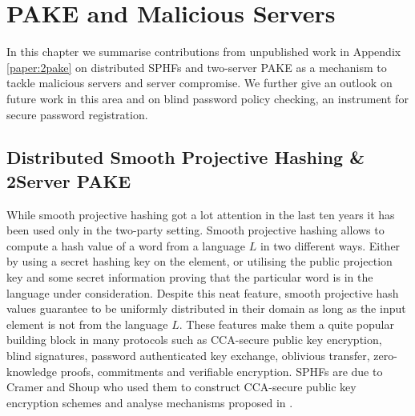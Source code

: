 \chapter{PAKE and Malicious Servers}\label{ch:malservers}
In this chapter we summarise contributions from unpublished work in Appendix \ref{paper:2pake} on distributed \aclp{SPHF} and two-server \ac{PAKE} as a mechanism to tackle malicious servers and server compromise.
We further give an outlook on future work in this area and on blind password policy checking, an instrument for secure password registration.

\section{Distributed Smooth Projective Hashing \& 2Server PAKE} \label{sec:twopake}
While smooth projective hashing got a lot attention in the last ten years it has been used only in the two-party setting.
Smooth projective hashing allows to compute a hash value of a word from a language $L$ in two different ways.
Either by using a secret hashing key on the element, or utilising the public projection key and some secret information proving that the particular word is in the language under consideration.
Despite this neat feature, smooth projective hash values guarantee to be uniformly distributed in their domain as long as the input element is not from the language $L$.
These features make them a quite popular building block in many protocols such as \ac{CCA}-secure public key encryption, blind signatures, password authenticated key exchange, oblivious transfer, zero-knowledge proofs, commitments and verifiable encryption.
\acp{SPHF} are due to Cramer and Shoup \cite{Cramer2001} who used them to construct \ac{CCA}-secure public key encryption schemes and analyse mechanisms proposed in \cite{Cramer1998}.

